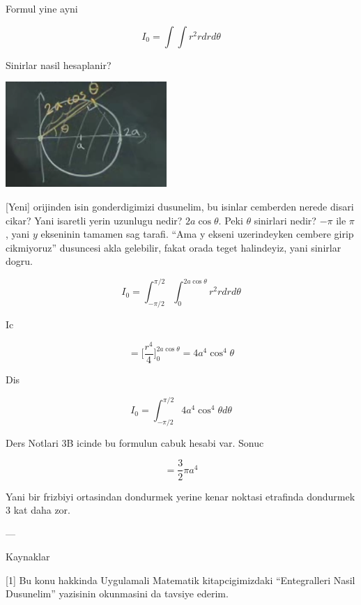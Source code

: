\documentclass[12pt,fleqn]{article}\usepackage{../common}
\begin{document}
Formul yine ayni

\[ I_0 = \int \int r^2 r dr d\theta \]

Sinirlar nasil hesaplanir? 

\includegraphics[height=4cm]{17_10.png}

[Yeni] orijinden isin gonderdigimizi dusunelim, bu isinlar cemberden nerede
disari cikar? Yani isaretli yerin uzunlugu nedir? $2a \cos\theta$. Peki
$\theta$ sinirlari nedir? $-\pi$ ile $\pi$, yani $y$ ekseninin tamamen sag
tarafi. ``Ama y ekseni uzerindeyken cembere girip cikmiyoruz'' dusuncesi
akla gelebilir, fakat orada teget halindeyiz, yani sinirlar dogru. 

\[ I_0 = \int_{-\pi/2}^{\pi/2} \int_0^{2a \cos\theta} r^2 r dr d\theta \]

Ic

\[ = \bigg[ \frac{r^4}{4} \bigg]_{0}^{2a \cos\theta} =
4a^4 \cos^4\theta
\]


Dis

\[ I_0 = \int_{-\pi/2}^{\pi/2} 4a^4 \cos^4\theta d\theta \]

Ders Notlari 3B icinde bu formulun cabuk hesabi var. Sonuc

\[  = \frac{3}{2} \pi a^4 \]

Yani bir frizbiyi ortasindan dondurmek yerine kenar noktasi etrafinda
dondurmek 3 kat daha zor. 






















---

Kaynaklar

[1] Bu konu hakkinda Uygulamali Matematik kitapcigimizdaki ``Entegralleri
Nasil Dusunelim'' yazisinin okunmasini da tavsiye ederim. 
\end{document}

